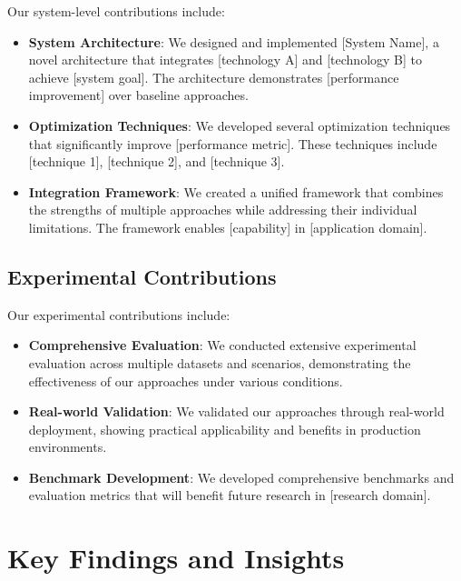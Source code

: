 Our system-level contributions include:

\begin{itemize}
    \item \textbf{System Architecture}: We designed and implemented [System Name], a novel architecture that integrates [technology A] and [technology B] to achieve [system goal]. The architecture demonstrates [performance improvement] over baseline approaches.
    
    \item \textbf{Optimization Techniques}: We developed several optimization techniques that significantly improve [performance metric]. These techniques include [technique 1], [technique 2], and [technique 3].
    
    \item \textbf{Integration Framework}: We created a unified framework that combines the strengths of multiple approaches while addressing their individual limitations. The framework enables [capability] in [application domain].
\end{itemize}

\subsection{Experimental Contributions}

Our experimental contributions include:

\begin{itemize}
    \item \textbf{Comprehensive Evaluation}: We conducted extensive experimental evaluation across multiple datasets and scenarios, demonstrating the effectiveness of our approaches under various conditions.
    
    \item \textbf{Real-world Validation}: We validated our approaches through real-world deployment, showing practical applicability and benefits in production environments.
    
    \item \textbf{Benchmark Development}: We developed comprehensive benchmarks and evaluation metrics that will benefit future research in [research domain].
\end{itemize}

\section{Key Findings and Insights}

